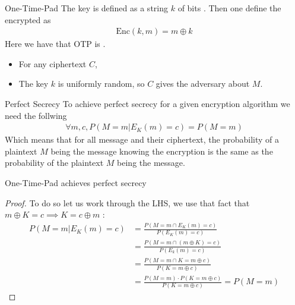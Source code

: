 \begin{parag}{One-Time-Pad}
    The key is defined as a string $k$ of  bits . Then one define the encrypted as 
	\begin{align*} 
		\text{Enc}\left(k, m\right) = m \oplus k 
	\end{align*}
	Here we have that OTP  is .
	\begin{itemize}
	    \item For any ciphertext $C$, 
	    \item The key $k$ is uniformly random, so $C$ gives the adversary  about $M$.
	\end{itemize}
	\begin{definition}{Perfect Secrecy}
	To achieve perfect secrecy for a given encryption algorithm we need the follwing 
	\begin{align*} 
		\forall m, c, P\left(M = m | E_{K}\left(m\right) = c\right) = P\left(M = m\right) 
	\end{align*}
	Which means that for all message and their ciphertext, the probability of a plaintext $M$ being the message knowing the encryption is the same as the probability of the plaintext $M$ being the message.
	\end{definition}
	\begin{theoreme}
	One-Time-Pad achieves perfect secrecy
	\end{theoreme}
	\begin{proof}
	    To do so let us work through the LHS, we use that fact that $m \oplus K =  c \implies K = c \oplus m$ :
		\begin{align*} 
			P\left(M = m | E_K\left(m\right) = c\right) &= \frac{P\left(M = m \cap E_K\left(m\right) = c\right)}{P\left(E_K\left(m\right) = c\right)}  \\
														&= \frac{P\left(M = m \cap \left(m \oplus K\right) = c\right)}{P\left(E_k\left(m\right) = c\right)}\\
														&= \frac{P\left(M = m \cap K = m \oplus c\right)}{P\left(K =  m \oplus c\right)}\\
														&=  \frac{P\left(M = m\right) \cdot  P\left(K =  m \oplus c\right)}{P\left(K = m \oplus c\right)} = P\left(M = m\right)
		\end{align*}
	\end{proof}
	
	
\end{parag}
